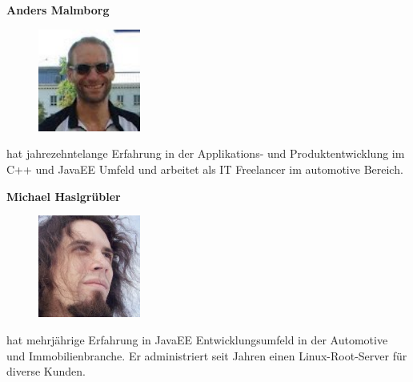 \documentclass[12pt,a4paper,ngerman]{article}
\begin{document}
\newcommand{\authorboxheight}{5cm}
\begin{minipage}[t][\authorboxheight]{0.45\textwidth}
\textbf{Anders Malmborg}
\vskip0.3cm
\begin{figure}
\vspace{-20pt}
\includegraphics[width=0.3\textwidth]{images/anders.jpg}
\vspace{-20pt}
\end{figure}
hat jahrezehntelange Erfahrung in der Applikations- und Produktentwicklung im C++ und JavaEE Umfeld und arbeitet als IT Freelancer im automotive Bereich. 
\end{minipage}
\hspace{0.1\textwidth}
\begin{minipage}[t][\authorboxheight]{0.45\textwidth}
\textbf{Michael Haslgrübler}
\vskip0.3cm
\begin{figure}
\vspace{-20pt}
\includegraphics[width=0.3\textwidth]{images/michael.jpg}
\vspace{-20pt}
\end{figure}
hat mehrjährige Erfahrung in JavaEE Entwicklungsumfeld in der Automotive und Immobilienbranche. Er administriert seit Jahren einen Linux-Root-Server für diverse Kunden.
\end{minipage}



\end{document}
